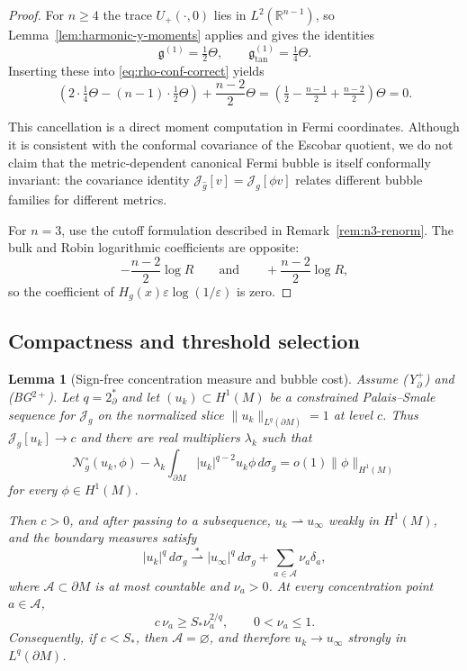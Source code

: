 \documentclass[11pt,reqno,a4paper]{amsart}
\newcommand{\R}{\mathbb{R}}
\numberwithin{equation}{section}
\theoremstyle{plain}
\newtheorem{lemma}[theorem]{Lemma}
\theoremstyle{remark}
\theoremstyle{plain}
\begin{document}
\begin{proof}
For $n\ge4$ the trace $U_+(\cdot,0)$ lies in $L^2(\R^{n-1})$, so Lemma~\ref{lem:harmonic-y-moments} applies and gives the identities
\[
\mathfrak g^{(1)}=\tfrac12\Theta,\qquad \mathfrak g^{(1)}_{\tan}=\tfrac14\Theta.
\]
Inserting these into \eqref{eq:rho-conf-correct} yields
\[
\left(2\cdot\tfrac14\Theta-(n-1)\cdot\tfrac12\Theta\right)+\frac{n-2}{2}\Theta
=\left(\tfrac12-\tfrac{n-1}{2}+\tfrac{n-2}{2}\right)\Theta
=0.
\]

This cancellation is a direct moment computation in Fermi coordinates.
Although it is consistent with the conformal covariance of the Escobar quotient,
we do not claim that the metric-dependent canonical Fermi bubble is itself
conformally invariant: the covariance identity
$\mathcal J_{\widehat g}[v]=\mathcal J_g[\phi v]$ relates different bubble
families for different metrics.

For $n=3$, use the cutoff formulation described in Remark~\ref{rem:n3-renorm}.
The bulk and Robin logarithmic coefficients are opposite:
\[
-\frac{n-2}{2}\log R
\qquad\text{and}\qquad
+\frac{n-2}{2}\log R,
\]
so the coefficient of $H_g(x)\varepsilon\log(1/\varepsilon)$ is zero.
\end{proof}


\subsection{Compactness and threshold selection}

\begin{lemma}[Sign-free concentration measure and bubble cost]
\label{lem:signfree-CC-bubble-cost}
Assume \textup{(Y$^+_{\partial}$)} and \textup{(BG$^{2+}$)}.  Let
$q=2_\partial^\ast$ and let $(u_k)\subset H^1(M)$ be a constrained
Palais--Smale sequence for $\mathcal J_g$ on the normalized slice
$\|u_k\|_{L^q(\partial M)}=1$ at level $c$.  Thus
$\mathcal J_g[u_k]\to c$ and there are real multipliers $\lambda_k$ such that
\begin{equation}\label{eq:PS-multiplier-cc}
\mathcal N_g^\circ(u_k,\phi)
-\lambda_k\int_{\partial M}|u_k|^{q-2}u_k\phi\,d\sigma_g
=o(1)\|\phi\|_{H^1(M)}
\end{equation}
for every $\phi\in H^1(M)$.

Then $c>0$, and after passing to a subsequence,
$u_k\rightharpoonup u_\infty$ weakly in $H^1(M)$, and the boundary measures
satisfy
\begin{equation}\label{eq:boundary-measure-splitting}
|u_k|^q\,d\sigma_g
\overset{\ast}{\rightharpoonup}
|u_\infty|^q\,d\sigma_g
+\sum_{a\in\mathcal A}\nu_a\delta_a,
\end{equation}
where $\mathcal A\subset\partial M$ is at most countable and $\nu_a>0$.
At every concentration point $a\in\mathcal A$,
\begin{equation}\label{eq:atom-cost-sharp}
c\,\nu_a\ge S_\ast\nu_a^{2/q},
\qquad 0<\nu_a\le1.
\end{equation}
Consequently, if $c<S_\ast$, then $\mathcal A=\varnothing$, and therefore
$u_k\to u_\infty$ strongly in $L^q(\partial M)$.
\end{lemma}
\end{document}

